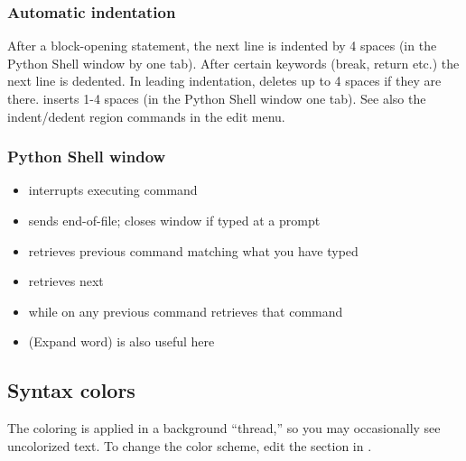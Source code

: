 \subsubsection{Automatic indentation}

After a block-opening statement, the next line is indented by 4 spaces
(in the Python Shell window by one tab).  After certain keywords
(break, return etc.) the next line is dedented.  In leading
indentation,  deletes up to 4 spaces if they are there.
 inserts 1-4 spaces (in the Python Shell window one tab).
See also the indent/dedent region commands in the edit menu.


\subsubsection{Python Shell window}

\begin{itemize}
\item   {} interrupts executing command
\item   {} sends end-of-file; closes window if typed at
a \samp{>>>~} prompt
\end{itemize}

\begin{itemize}
\item   {} retrieves previous command matching what you have typed
\item   {} retrieves next
\item   {} while on any previous command retrieves that command
\item   {} (Expand word) is also useful here
\end{itemize}



\subsection{Syntax colors}

The coloring is applied in a background ``thread,'' so you may
occasionally see uncolorized text.  To change the color
scheme, edit the \code{[Colors]} section in .

